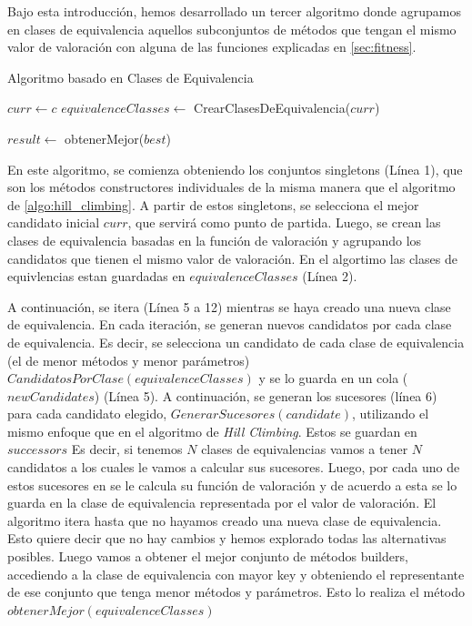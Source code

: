  Bajo esta introducción, hemos desarrollado un tercer algoritmo donde agrupamos en clases de equivalencia aquellos subconjuntos de métodos que tengan el mismo valor de valoración con alguna de las funciones explicadas en \ref{sec:fitness}.


\begin{algorithm}[H]
  \caption{Algoritmo basado en Clases de Equivalencia}
  \label{algo:clases_equivalencia}
  \SetAlgoLined
  $curr \gets c$\; 
  $equivalenceClasses \gets$ CrearClasesDeEquivalencia($curr$)\;
  
  
  $result \gets$ obtenerMejor($best$)\;
  \;
\end{algorithm}

En este algoritmo, se comienza obteniendo los conjuntos singletons (Línea 1), que son los métodos constructores individuales de la misma manera que el algoritmo de \ref{algo:hill_climbing}. A partir de estos singletons, se selecciona el mejor candidato inicial $curr$, que servirá como punto de partida. Luego, se crean las clases de equivalencia basadas en la función de valoración y agrupando los candidatos que tienen el mismo valor de valoración. En el algortimo las clases de equivlencias estan guardadas en $equivalenceClasses$ (Línea 2).

A continuación, se itera (Línea 5 a 12) mientras se haya creado una nueva clase de equivalencia. En cada iteración, se generan nuevos candidatos por cada clase de equivalencia. Es decir, se selecciona un candidato de cada clase de equivalencia (el de menor métodos y menor parámetros) $CandidatosPorClase(equivalenceClasses)$ y se lo guarda en un cola ($newCandidates$) (Línea 5). A continuación, se generan los sucesores (línea 6) para cada candidato elegido, $GenerarSucesores(candidate)$, utilizando el mismo enfoque que en el algoritmo de \emph{Hill Climbing}. Estos se guardan en $successors$ Es decir, si tenemos $N$ clases de equivalencias vamos a tener $N$ candidatos a los cuales le vamos a calcular sus sucesores.  Luego, por cada uno de estos sucesores en  se le calcula su función de valoración y de acuerdo a esta se lo guarda en la clase de equivalencia representada por el valor de valoración.
El algoritmo itera hasta que no hayamos creado una nueva clase de equivalencia. Esto quiere decir que no hay cambios y hemos explorado todas las alternativas posibles. 
Luego vamos a obtener el mejor conjunto de métodos builders, accediendo a la clase de equivalencia con mayor key y obteniendo el representante de ese conjunto que tenga menor métodos y parámetros. Esto lo realiza el método $obtenerMejor(equivalenceClasses)$



